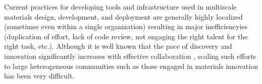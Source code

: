 \documentclass{bmcart}
\begin{document}






Current practices for developing tools and infrastructure used in multiscale materials design, development, and deployment are generally highly localized (sometimes even within a single organization) resulting in major inefficiencyies (duplication of effort, lack of code review, not engaging the right talent for the right task, etc.). Although it is well known that the pace of discovery and innovation  significantly increases with effective collaboration \cite{sawhney2005collaborating, edwards2009open, bayne2008interdisciplinary, boudreau2010open}, scaling such efforts to large heterogeneous communities such as those engaged in materials innovation has been very difficult.
\end{document}
